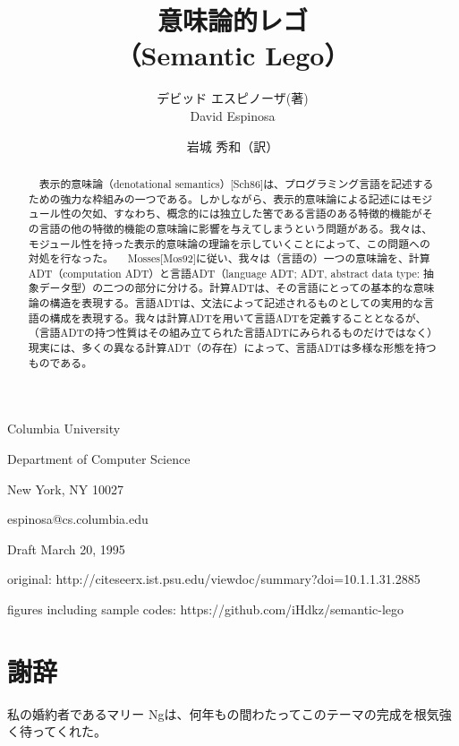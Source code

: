 \documentclass[11pt, oneside]{jsarticle}   	%
\title{意味論的レゴ\\
（Semantic Lego）
}
\author{デビッド エスピノーザ(著)\\
David Espinosa
\and
岩城 秀和（訳）
}
\begin{document}
\maketitle

\begin{center}
Columbia University

Department of Computer Science

New York, NY 10027

espinosa@cs.columbia.edu

Draft March 20, 1995


original: http://citeseerx.ist.psu.edu/viewdoc/summary?doi=10.1.1.31.2885

figures including sample codes: https://github.com/iHdkz/semantic-lego
\end{center}

\newpage
\begin{abstract}
　表示的意味論（denotational semantics）[Sch86]は、プログラミング言語を記述するための強力な枠組みの一つである。しかしながら、表示的意味論による記述にはモジュール性の欠如、すなわち、概念的には独立した筈である言語のある特徴的機能がその言語の他の特徴的機能の意味論に影響を与えてしまうという問題がある。我々は、モジュール性を持った表示的意味論の理論を示していくことによって、この問題への対処を行なった。
　Mosses[Mos92]に従い、我々は（言語の）一つの意味論を、計算ADT（computation ADT）と言語ADT（language ADT; ADT, abstract data type: 抽象データ型）の二つの部分に分ける。計算ADTは、その言語にとっての基本的な意味論の構造を表現する。言語ADTは、文法によって記述されるものとしての実用的な言語の構成を表現する。我々は計算ADTを用いて言語ADTを定義することとなるが、（言語ADTの持つ性質はその組み立てられた言語ADTにみられるものだけではなく）現実には、多くの異なる計算ADT（の存在）によって、言語ADTは多様な形態を持つものである。
\end{abstract}

\newpage
\tableofcontents

\section*{謝辞}
私の婚約者であるマリー Ngは、何年もの間わたってこのテーマの完成を根気強く待ってくれた。
\newpage

\end{document}
